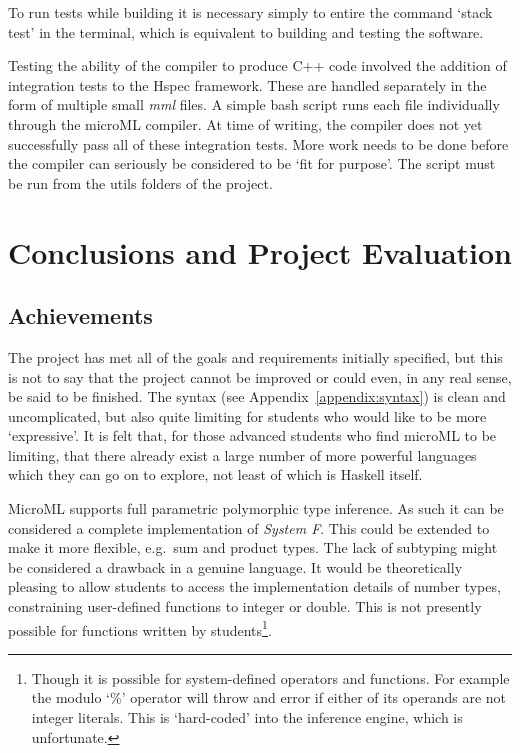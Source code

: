 \documentclass[12pt, a4paper]{report}
\begin{document}
To run tests while building it is necessary simply to entire the command `stack test' in the
terminal, which is equivalent to building and testing the software.

Testing the ability of the compiler to produce C++ code involved the addition of integration tests
to the Hspec framework. These are handled separately in the form of multiple small \textit{mml}
files. A simple bash script runs each file individually through the microML compiler. At time of
writing, the compiler does not yet successfully pass all of these integration tests. More work needs
to be done before the compiler can seriously be considered to be `fit for purpose'. The script must
be run from the utils folders of the project.

\chapter{Conclusions and Project Evaluation}

\section{Achievements}
The project has met all of the goals and requirements initially specified, but this is not to say
that the project cannot be improved or could even, in any real sense, be said to be finished. The
syntax (see Appendix~\ref{appendix:syntax}) is clean and uncomplicated, but also quite limiting for
students who would like to be more `expressive'. It is felt that, for those advanced students who
find microML to be limiting, that there already exist a large number of more powerful languages
which they can go on to explore, not least of which is Haskell itself. 

MicroML supports full parametric polymorphic type inference. As such it can be considered a complete
implementation of \textit{System F}. This could be extended to make it more flexible, e.g.\ sum and
product types. The lack of subtyping might be considered a drawback in a genuine language. It would
be theoretically pleasing to allow students to access the implementation details of number types,
constraining user-defined functions to integer or double. This is not presently possible for
functions written by students\footnote{Though it is possible for system-defined operators and
functions. For example the modulo `\%' operator will throw and error if either of its operands are
not integer literals. This is `hard-coded' into the inference engine, which is unfortunate.}.
\end{document}
